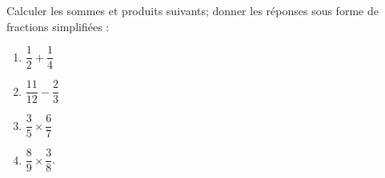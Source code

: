 
\begin{exercice}\label{exosmath-0974}

    Calculer les sommes et produits suivants; donner les réponses sous forme de fractions simplifiées :
    \begin{multicols}{4}
        \begin{enumerate}
            \item
                \( \dfrac{ 1 }{ 2 }+\dfrac{ 1 }{ 4 } \)
            \item
                \( \dfrac{ 11 }{ 12 }-\dfrac{ 2 }{ 3 }\)
            \item
                \( \dfrac{ 3 }{ 5 }\times \dfrac{ 6 }{ 7 }\)
            \item
                \( \dfrac{ 8 }{ 9 }\times \dfrac{ 3 }{ 8 }\).
        \end{enumerate}
    \end{multicols}

\end{exercice}

